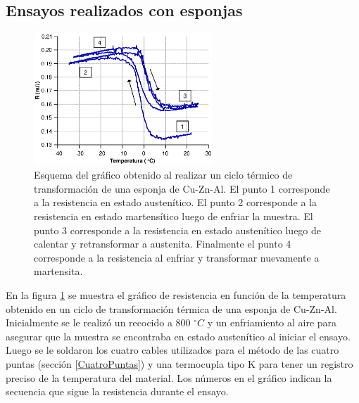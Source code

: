 \documentclass[a4paper,12pt,fleqn,twoside,openany]{book}
\begin{document}
% 
% 


% 

 
%  
  
  
\subsection{Ensayos realizados con esponjas}
 
 \begin{figure}[h]
 \centering
 \includegraphics[width=0.6\textwidth]{Img/Resultados/Resistencia/HistExplicacion.eps}
 \caption{Esquema del gráfico obtenido al realizar un ciclo térmico de transformación de una esponja de Cu-Zn-Al. El punto 1 corresponde a la resistencia en estado austenítico. El punto 2 corresponde a la resistencia en estado martensítico luego de enfriar la muestra. El punto 3 corresponde a la resistencia en estado austenítico luego de calentar y retransformar a austenita. Finalmente el punto 4 corresponde a la resistencia al enfriar y transformar nuevamente a martensita.} 
 \label{fig:HistExplicacion}
 \end{figure}

 
 En la figura \ref{fig:HistExplicacion} se muestra el gráfico de resistencia en función de la temperatura obtenido en un ciclo de transformación térmica de una esponja de Cu-Zn-Al. Inicialmente se le realizó un recocido a 800 $^\circ C$ y un enfriamiento al aire para asegurar que la muestra se encontraba en estado austenítico al iniciar el ensayo. Luego se le soldaron los cuatro cables utilizados para el método de las cuatro puntas (sección \ref{CuatroPuntas}) y una termocupla tipo K para tener un registro preciso de la temperatura del material. Los números en el gráfico indican la secuencia que sigue la resistencia durante el ensayo. 
 
\end{document}
